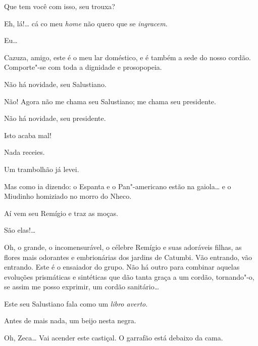    Que tem você com isso,
seu trouxa?

 Eh, lá!\ldots{} cá co meu \textit{home} não quero que se
\textit{ingracem}.

 Eu\ldots

 Cazuza, amigo, este é o meu lar doméstico, e é 
também a sede do nosso cordão. Comporte"-se com toda a dignidade e prosopopeia.

 Não há novidade, seu Salustiano.

 Não! Agora não me chama seu Salustiano; me chama seu
presidente.

 Não há novidade, seu presidente.

   Isto acaba mal!

 Nada receies.

 Um trambolhão já levei.

 Mas como ia dizendo: o Espanta e o Pan"-americano estão na
gaiola\ldots{} e o Miudinho homiziado no morro do Nheco.

  Aí vem seu Remígio e traz as moças.

 São elas!\ldots



  Oh, o grande, o
incomensurável, o célebre Remígio e suas adoráveis filhas, as flores mais
odorantes e embrionárias dos jardins de Catumbi. Vão entrando, vão entrando.
  Este é o
ensaiador do grupo. Não há outro para combinar aquelas evoluções prismáticas e
sintéticas que dão tanta graça a um cordão, tornando"-o, se assim me posso
exprimir, um cordão sanitário\ldots{} 

 Este seu Salustiano fala como um \textit{libro averto}.

 Antes de mais nada, um beijo nesta negra. 

 Oh, Zeca\ldots{} Vai acender este castiçal. O garrafão está
debaixo da cama. 

